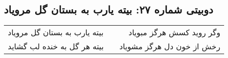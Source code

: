 \begin{center}
\section*{دوبیتی شماره ۲۷: بیته یارب به بستان گل مرویاد}
\label{sec:027}
\begin{longtable}{l p{0.5cm} r}
بیته یارب به بستان گل مرویاد
&&
وگر روید کسش هرگز مبویاد
\\
بیته هر گل به خنده لب گشاید
&&
رخش از خون دل هرگز مشویاد
\\
\end{longtable}
\end{center}
